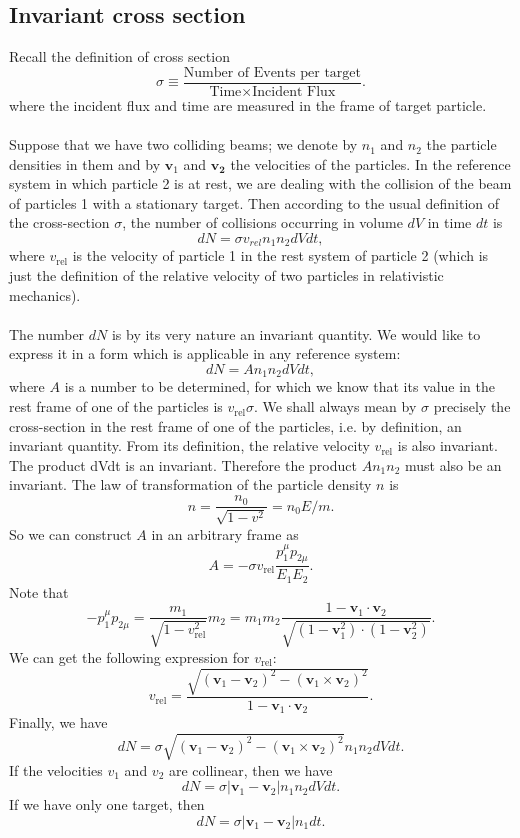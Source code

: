 \subsection{Invariant cross section}
Recall the definition of cross section
\[\sigma \equiv \frac{\mbox{Number of Events per target}}{\mbox{Time} \times \mbox{Incident Flux}}.\]
where the incident flux and time are measured in the frame of target particle.
\\ \\
Suppose that we have two colliding beams; we denote by $n_1$ and $n_2$ the particle densities in them and by $\bm{v}_1$ and $\bm{v_2}$ the velocities of the particles. In the reference system in which particle 2 is at rest, we are dealing with the collision of the beam of particles 1 with a stationary target. Then according to the usual definition of the cross-section $\sigma$, the number of collisions occurring in volume $dV$ in time $dt$ is 
\[dN = \sigma v_{rel} n_1 n_2 dV dt,\]
where $v_{\mathrm{rel}}$ is the velocity of particle 1 in the rest system of particle 2 (which is just the definition of the relative velocity of two particles in relativistic mechanics). 
\\ \\
The number $dN$ is by its very nature an invariant quantity. We would like to express it in a form which is applicable in any reference system: 
\[dN = A n_1 n_2 dV dt,\] 
where $A$ is a number to be determined, for which we know that its value in the rest frame of one of the particles is $v_{\mathrm{rel}} \sigma$. We shall always mean by $\sigma$ precisely the cross-section in the rest frame of one of the particles, i.e. by definition, an invariant quantity. From its definition, the relative velocity $v_{\mathrm{rel}}$ is also invariant. The product dVdt is an invariant. Therefore the product $A n_1 n_2$ must also be an invariant. The law of transformation of the particle density $n$ is
\[n = \frac{n_0}{\sqrt{1-v^2}} = n_0 E/m.\]
So we can construct $A$ in an arbitrary frame as
\[A = -\sigma v_{\mathrm{rel}} \frac{p_1^{\mu}p_{2\mu}}{E_1 E_2}.\]
Note that
\[-p_1^{\mu}p_{2\mu} = \frac{m_1}{\sqrt{1-v_{\mathrm{rel}}^2}}m_2 = m_1 m_2 \frac{1-\bm{v}_1\cdot\bm{v}_2}{\sqrt{(1-\bm{v}_1^2)\cdot(1-\bm{v}_2^2)}}.\]
We can get the following expression for $v_{\mathrm{rel}}$:
\[v_{\mathrm{rel}} = \frac{\sqrt{(\bm{v}_1-\bm{v}_2)^2-(\bm{v}_1\times\bm{v}_2)^2}}{1-\bm{v}_1\cdot\bm{v}_2}.\]
Finally, we have
\[dN = \sigma \sqrt{(\bm{v}_1-\bm{v}_2)^2-(\bm{v}_1\times\bm{v}_2)^2} n_1 n_2 dV dt.\]
If the velocities $v_1$ and $v_2$ are collinear, then we have
\[dN = \sigma |\bm{v}_1 - \bm{v}_2| n_1 n_2 dV dt.\]
If we have only one target, then
\[dN = \sigma |\bm{v}_1 - \bm{v}_2| n_1 dt.\]

